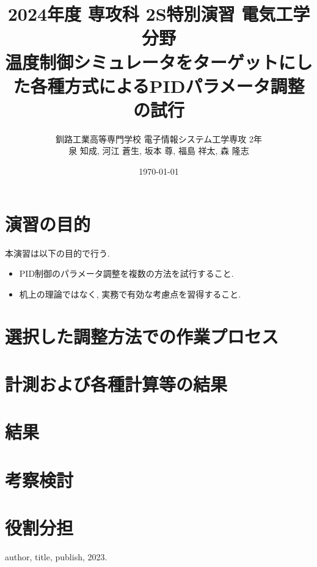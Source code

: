 \documentclass[a4j, titlepage]{jarticle}
\title{2024年度 専攻科 2S特別演習 電気工学分野\\温度制御シミュレータをターゲットにした各種方式によるPIDパラメータ調整の試行}
\author{釧路工業高等専門学校 電子情報システム工学専攻 2年\\泉 知成, 河江 蒼生, 坂本 尊, 福島 祥太, 森 隆志}
\date{\today}
\begin{document}
\maketitle
\tableofcontents
\clearpage
\section{演習の目的}
本演習は以下の目的で行う. 
\begin{itemize}
    \item PID制御のパラメータ調整を複数の方法を試行すること.
    \item 机上の理論ではなく, 実務で有効な考慮点を習得すること.
\end{itemize}
\section{選択した調整方法での作業プロセス}
\section{計測および各種計算等の結果}
\section{結果}
\section{考察検討}
\section{役割分担}

\begin{thebibliography}{9}
   author, title, publish, 2023.
\end{thebibliography}
\end{document}
